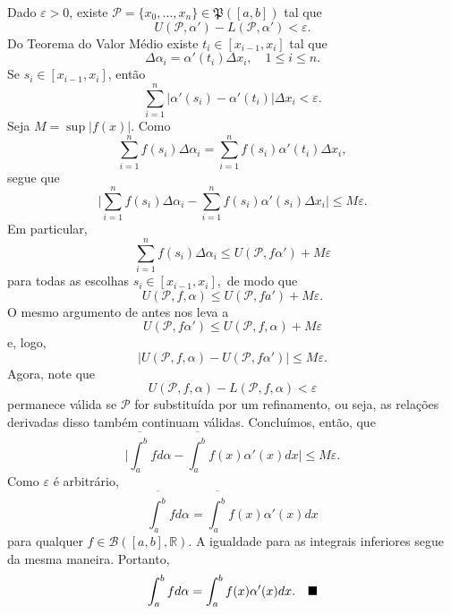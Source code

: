 \documentclass[Analysis/analysis_notes.tex]{subfiles}
\begin{document}
\begin{proof*}
	Dado \(\varepsilon > 0\), existe \(\mathcal{P} = \{x_{0},\dotsc ,x_{n}\}\in \mathfrak{P}([a, b])\) tal que
	\[
		U(\mathcal{P}, \alpha ') - L(\mathcal{P}, \alpha') < \varepsilon .
	\]
	Do \hypertarget{mean_value}{Teorema do Valor Médio} existe \(t_{i}\in [x_{i-1}, x_{i}]\) tal que
	\[
		\Delta \alpha_{i} = \alpha'(t_{i})\Delta x_{i},\quad 1\leq i\leq n.
	\]
	Se \(s_{i}\in [x_{i-1}, x_{i}]\), então
	\[
		\sum\limits_{i=1}^{n}|\alpha '(s_{i}) - \alpha '(t_{i})|\Delta x_{i} < \varepsilon .
	\]
	Seja \(M = \sup|f(x)|\). Como
	\[
		\sum\limits_{i=1}^{n}f(s_{i})\Delta \alpha_{i} = \sum\limits_{i=1}^{n}f(s_{i})\alpha'(t_{i})\Delta x_{i},
	\]
	segue que
	\[
		\biggl\vert \sum\limits_{i=1}^{n}f(s_{i})\Delta \alpha_{i} - \sum\limits_{i=1}^{n}f(s_{i})\alpha'(s_{i})\Delta x_{i} \biggr\vert \leq M\varepsilon .
	\]
	Em particular,
	\[
		\sum\limits_{i=1}^{n}f(s_{i})\Delta \alpha_{i} \leq U(\mathcal{P}, f\alpha') + M\varepsilon
	\]
	para todas as escolhas \(s_{i}\in [x_{i-1}, x_{i}],\) de modo que
	\[
		U(\mathcal{P}, f, \alpha )\leq U(\mathcal{P}, fa') + M\varepsilon .
	\]
	O mesmo argumento de antes nos leva a
	\[
		U(\mathcal{P}, f\alpha') \leq U(\mathcal{P}, f, \alpha ) + M\varepsilon
	\]
	e, logo,
	\[
		|U(\mathcal{P}, f, \alpha ) - U(\mathcal{P}, f\alpha ')| \leq M\varepsilon .
	\]
	Agora, note que
	\[
		U(\mathcal{P}, f, \alpha ) - L(\mathcal{P}, f, \alpha ) < \varepsilon
	\]
	permanece válida se \(\mathcal{P}\) for substituída por um refinamento, ou seja, as relações derivadas disso
	também continuam válidas. Concluímos, então, que
	\[
		\biggl\vert \overline{\int_{a}^{b}}f d\alpha - \overline{\int_{a}^{b}}f(x)\alpha '(x)dx \biggr\vert\leq M\varepsilon .
	\]
	Como \(\varepsilon \) é arbitrário,
	\[
		\overline{\int_{a}^{b}}fd\alpha = \overline{\int_{a}^{b}}f(x)\alpha '(x)dx
	\]
	para qualquer \(f\in \mathcal{B}([a, b], \mathbb{R}).\) A igualdade para as integrais inferiores segue da mesma maneira. Portanto,
	\[
		\int_{a}^{b}fd\alpha = \int_{a}^{b}f(x)\alpha '(x)dx.\quad \text{$\blacksquare$}
	\]
\end{proof*}
\end{document}
